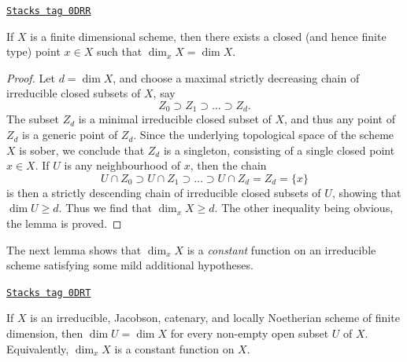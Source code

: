 \begin{lemma}
\label{stacks-geometry-lemma-dimension-achieved-by-finite-type-point}
\href{https://stacks.math.columbia.edu/tag/0DRR}{\texttt{Stacks tag 0DRR}}

If $X$ is a finite dimensional scheme,
then there exists a closed (and hence finite type) point $x \in X$
such that $\dim_x X = \dim X$.
\end{lemma}

\begin{proof}
Let $d = \dim X$,
and choose a maximal strictly decreasing
chain of irreducible closed subsets of $X$,
say
\begin{equation}
\label{equation-maximal-chain}
Z_0 \supset Z_1 \supset \ldots \supset Z_d.
\end{equation}
The subset $Z_d$ is a minimal irreducible closed subset of $X$,
and thus any point of $Z_d$ is a generic point of $Z_d$.
Since the underlying topological space of the scheme $X$ is sober,
we conclude that $Z_d$ is a singleton, consisting of a single
closed point $x \in X$.
If $U$ is
any neighbourhood of $x$, then
the chain
$$
U\cap Z_0 \supset U\cap Z_1 \supset \ldots \supset U\cap Z_d = Z_d =
\{x\}
$$
is then a strictly descending chain of irreducible
closed subsets of $U$, showing that $\dim U \geq d$.
Thus we find that $\dim_x X \geq d$.  The other inequality
being obvious, the lemma is proved.
\end{proof}

The next lemma shows that $\dim_x X$ is a {\it constant} function
on an irreducible scheme satisfying some mild additional hypotheses.

\begin{lemma}
\label{stacks-geometry-lemma-constancy-of-dimension}
\href{https://stacks.math.columbia.edu/tag/0DRT}{\texttt{Stacks tag 0DRT}}

If $X$ is an irreducible, Jacobson, catenary, and locally Noetherian
scheme of finite dimension,
then $\dim U = \dim X$ for every
non-empty open subset $U$ of $X$.
Equivalently, $\dim_x X$ is a constant function on $X$.
\end{lemma}

